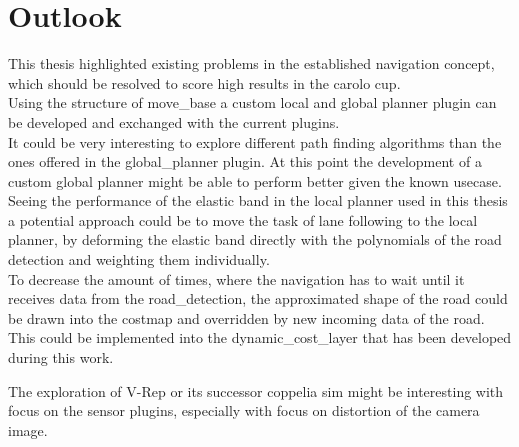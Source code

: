 \chapter{Outlook}
\label{outlook}

This thesis highlighted existing problems in the established navigation concept, which should be resolved to score high results in the carolo cup.\\

Using the structure of move\_base a custom local and global planner plugin can be developed and exchanged with the current plugins.\\

It could be very interesting to explore different path finding algorithms than the ones offered in the global\_planner plugin. At this point the development of a custom global planner might be able to perform better given the known usecase.\\

Seeing the performance of the elastic band in the local planner used in this thesis a potential approach could be to move the task of lane following to the local planner, by deforming the elastic band directly with the polynomials of the road detection and weighting them individually.\\

To decrease the amount of times, where the navigation has to wait until it receives data from the road\_detection, the approximated shape of the road could be drawn into the costmap and overridden by new incoming data of the road. This could be implemented into the dynamic\_cost\_layer that has been developed during this work.

The exploration of V-Rep or its successor coppelia sim might be interesting with focus on the sensor plugins, especially with focus on distortion of the camera image.